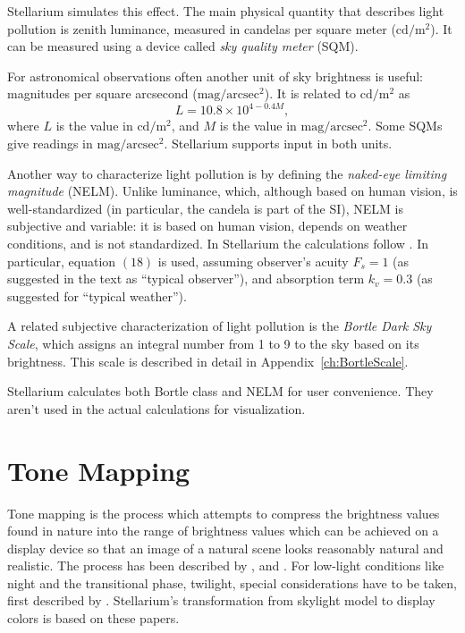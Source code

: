 Stellarium simulates this effect. The main physical quantity that describes light pollution is zenith luminance, measured in candelas per square meter ($\mathrm{cd/m^2}$). It can be measured using a device called \emph{sky quality meter} (SQM).

For astronomical observations often another unit of sky brightness is useful: magnitudes per square arcsecond ($\mathrm{mag/arcsec^2}$). It is related to $\mathrm{cd/m^2}$ as
\begin{equation}
L=10.8\times10^{4-0.4M},
\end{equation}
where $L$ is the value in $\mathrm{cd/m^2}$, and $M$ is the value in $\mathrm{mag/arcsec^2}$. Some SQMs give readings in $\mathrm{mag/arcsec^2}$. Stellarium supports input in both units.

Another way to characterize light pollution is by defining the \emph{naked-eye limiting magnitude} (NELM). Unlike luminance, which, although based on human vision, is well-standardized (in particular, the candela is part of the SI), NELM is subjective and variable: it is based on human vision, depends on weather conditions, and is not standardized. In Stellarium the calculations follow \citet{Schaefer:LimitingMagnitudes}. In particular, equation $(18)$ is used, assuming observer's acuity $F_s=1$ (as suggested in the text as ``typical observer''), and absorption term $k_v=0.3$ (as suggested for ``typical weather'').

A related subjective characterization of light pollution is the \emph{Bortle Dark Sky Scale}, which assigns an integral number from 1 to 9 to the sky based on its brightness. This scale is described in detail in Appendix~\ref{ch:BortleScale}.

Stellarium calculates both Bortle class and NELM for user convenience. They aren't used in the actual calculations for visualization.

\section{Tone Mapping}

Tone mapping is the process which attempts to compress the brightness
values found in nature into the range of brightness values which can
be achieved on a display device so that an image of a natural scene looks reasonably natural
and realistic. The process has been described by
\citet{TumblinRushmeier:1993}, \citet{Larson:1997} and
\citet{DevlinChalmersWilkie:2002}. For low-light conditions like night
and the transitional phase, twilight, special considerations have to
be taken, first described by \citet{WannJensen:2000}.
Stellarium's transformation from skylight model to display colors is based on these papers.


